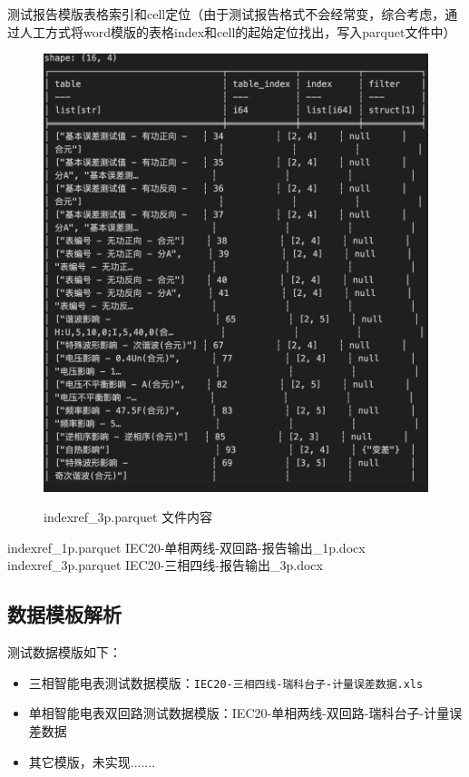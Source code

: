 测试报告模版表格索引和cell定位（由于测试报告格式不会经常变，综合考虑，通过人工方式将word模版的表格index和cell的起始定位找出，写入parquet文件中）
\begin{figure}[H]
    \begin{center}
        \includegraphics[width=.95\linewidth]{res/3p_parquetdata.png}\\
        \caption{indexref\_3p.parquet 文件内容 }\label{3p_parquetdata}
    \end{center}
\end{figure}

indexref\_1p.parquet \hspace{0.4em}  \faArrowRight \hspace{0.4em} IEC20-单相两线-双回路-报告输出\_1p.docx\\
indexref\_3p.parquet \hspace{0.4em} \faArrowRight \hspace{0.4em} IEC20-三相四线-报告输出\_3p.docx\\


\subsection{数据模板解析}
测试数据模版如下：
\vspace{-.7cm}
    \begin{itemize}
        \item 三相智能电表测试数据模版：\texttt{IEC20-三相四线-瑞科台子-计量误差数据.xls} 
        \item 单相智能电表双回路测试数据模版：IEC20-单相两线-双回路-瑞科台子-计量误差数据 
        \item 其它模版，未实现.......
    \end{itemize}


